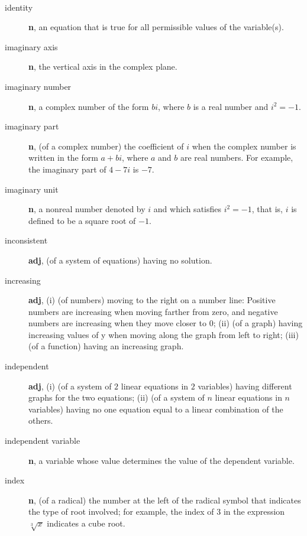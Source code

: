\documentclass[10pt,]{book}
\newcommand{\terminology}[1]{\textbf{#1}}
\theoremstyle{plain}
\theoremstyle{definition}
\theoremstyle{definition}
\theoremstyle{definition}
\numberwithin{equation}{part}
\begin{document}
\paragraph[{}]{}\hypertarget{paragraphs-13}{}
\leavevmode%
\begin{description}
\item[{identity}]\hypertarget{li-616}{}\terminology{n}, an equation that is true for all permissible values of the variable(s).%
\item[{imaginary axis}]\hypertarget{li-617}{}\terminology{n}, the vertical axis in the complex plane.%
\item[{imaginary number}]\hypertarget{li-618}{}\terminology{n}, a complex number of the form \(bi\), where \(b\) is a real number and \(i^2 = −1\).%
\item[{imaginary part}]\hypertarget{li-619}{}\terminology{n}, (of a complex number) the coefficient of \(i\) when the complex number is written in the form \(a + bi\), where \(a\) and \(b\) are real numbers. For example, the imaginary part of \(4 − 7i\) is \(− 7\).%
\item[{imaginary unit}]\hypertarget{li-620}{}\terminology{n}, a nonreal number denoted by \(i\) and which satisfies \(i^2= −1\), that is, \(i\) is defined to be a square root of \(−1\).%
\item[{inconsistent}]\hypertarget{li-621}{}\terminology{adj}, (of a system of equations) having no solution.%
\item[{increasing}]\hypertarget{li-622}{}\terminology{adj}, (i) (of numbers) moving to the right on a number line: Positive numbers are increasing when moving farther from zero, and negative numbers are increasing when they move closer to \(0\); (ii) (of a graph) having increasing values of y when moving along the graph from left to right; (iii) (of a function) having an increasing graph.%
\item[{independent}]\hypertarget{li-623}{}\terminology{adj}, (i) (of a system of \(2\) linear equations in \(2\) variables) having different graphs for the two equations; (ii) (of a system of \(n\) linear equations in \(n\) variables) having no one equation equal to a linear combination of the others.%
\item[{independent variable}]\hypertarget{li-624}{}\terminology{n}, a variable whose value determines the value of the dependent variable.%
\item[{index}]\hypertarget{li-625}{}\terminology{n}, (of a radical) the number at the left of the radical symbol that indicates the type of root involved; for example, the index of \(3\) in the expression \(\sqrt[3]{x}\) indicates a cube root.%

\end{description}
\end{document}
